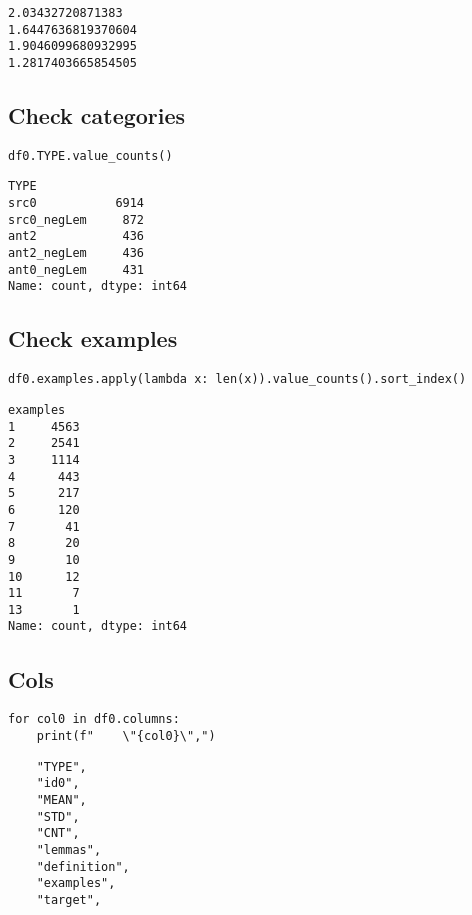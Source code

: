 \documentclass[a4paper,10pt,onecolumn,oneside,openright]{article}
\begin{document}
\begin{verbatim}
2.03432720871383
1.6447636819370604
1.9046099680932995
1.2817403665854505
\end{verbatim}

\subsection{Check categories}
\label{sec:orgf816286}
\begin{verbatim}
df0.TYPE.value_counts()
\end{verbatim}

\begin{verbatim}
TYPE
src0           6914
src0_negLem     872
ant2            436
ant2_negLem     436
ant0_negLem     431
Name: count, dtype: int64
\end{verbatim}

\subsection{Check examples}
\label{sec:org485f180}
\begin{verbatim}
df0.examples.apply(lambda x: len(x)).value_counts().sort_index()
\end{verbatim}

\begin{verbatim}
examples
1     4563
2     2541
3     1114
4      443
5      217
6      120
7       41
8       20
9       10
10      12
11       7
13       1
Name: count, dtype: int64
\end{verbatim}

\subsection{Cols}
\label{sec:org38e5e80}
\begin{verbatim}
for col0 in df0.columns:
    print(f"    \"{col0}\",")
\end{verbatim}

\begin{verbatim}
    "TYPE",
    "id0",
    "MEAN",
    "STD",
    "CNT",
    "lemmas",
    "definition",
    "examples",
    "target",
\end{verbatim}
\end{document}
